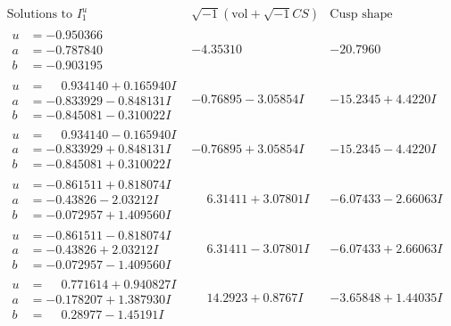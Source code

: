 \documentclass[1p]{elsarticle_modified}
\theoremstyle{definition}
\newcommand{\I}{\sqrt{-1}}
\begin{document}
$$\begin{array}{c|c|c}  
\text{Solutions to }I^u_{1}& \I (\text{vol} + \sqrt{-1}CS) & \text{Cusp shape}\\
 \hline 
\begin{aligned}
u &= -0.950366\phantom{ +0.000000I} \\
a &= -0.787840\phantom{ +0.000000I} \\
b &= -0.903195\phantom{ +0.000000I}\end{aligned}
 & -4.35310\phantom{ +0.000000I} & -20.7960\phantom{ +0.000000I} \\ \hline\begin{aligned}
u &= \phantom{-}0.934140 + 0.165940 I \\
a &= -0.833929 - 0.848131 I \\
b &= -0.845081 - 0.310022 I\end{aligned}
 & -0.76895 - 3.05854 I & -15.2345 + 4.4220 I \\ \hline\begin{aligned}
u &= \phantom{-}0.934140 - 0.165940 I \\
a &= -0.833929 + 0.848131 I \\
b &= -0.845081 + 0.310022 I\end{aligned}
 & -0.76895 + 3.05854 I & -15.2345 - 4.4220 I \\ \hline\begin{aligned}
u &= -0.861511 + 0.818074 I \\
a &= -0.43826 - 2.03212 I \\
b &= -0.072957 + 1.409560 I\end{aligned}
 & \phantom{-}6.31411 + 3.07801 I & -6.07433 - 2.66063 I \\ \hline\begin{aligned}
u &= -0.861511 - 0.818074 I \\
a &= -0.43826 + 2.03212 I \\
b &= -0.072957 - 1.409560 I\end{aligned}
 & \phantom{-}6.31411 - 3.07801 I & -6.07433 + 2.66063 I \\ \hline\begin{aligned}
u &= \phantom{-}0.771614 + 0.940827 I \\
a &= -0.178207 + 1.387930 I \\
b &= \phantom{-}0.28977 - 1.45191 I\end{aligned}
 & \phantom{-}14.2923 + 0.8767 I & -3.65848 + 1.44035 I \\ \hline\begin{aligned}

\end{aligned}
\end{array}$$
\end{document}

